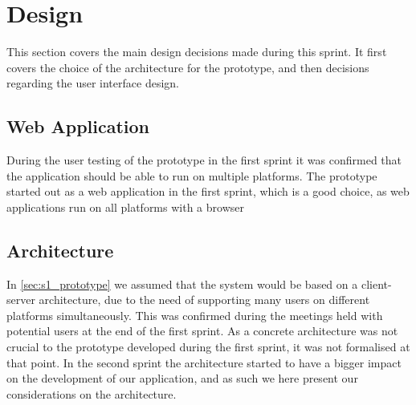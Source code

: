 \section{Design} \label{sec:s2_design}
This section covers the main design decisions made during this sprint. It first covers the choice of the architecture for the prototype, and then decisions regarding the user interface design.

\subsection{Web Application}

During the user testing of the prototype in the first sprint it was confirmed that the application should be able to run on multiple platforms. The prototype started out as a web application in the first sprint, which is a good choice, as web applications run on all platforms with a browser


\subsection{Architecture} \label{sec:s2_architecture}
In \cref{sec:s1_prototype} we assumed that the system would be based on a client-server architecture, due to the need of supporting many users on different platforms simultaneously. This was confirmed during the meetings held with potential users at the end of the first sprint. As a concrete architecture was not crucial to the prototype developed during the first sprint, it was not formalised at that point. In the second sprint the architecture started to have a bigger impact on the development of our application, and as such we here present our considerations on the architecture.

